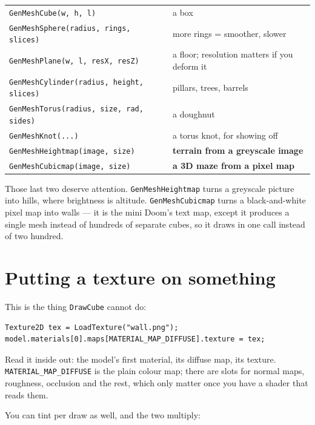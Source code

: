 \begin{center}
\begin{tabular}{@{}ll@{}}
\toprule
\lstinline|GenMeshCube(w, h, l)| & a box \\
\lstinline|GenMeshSphere(radius, rings, slices)| & more rings = smoother, slower \\
\lstinline|GenMeshPlane(w, l, resX, resZ)| & a floor; resolution matters if you deform it \\
\lstinline|GenMeshCylinder(radius, height, slices)| & pillars, trees, barrels \\
\lstinline|GenMeshTorus(radius, size, rad, sides)| & a doughnut \\
\lstinline|GenMeshKnot(...)| & a torus knot, for showing off \\
\lstinline|GenMeshHeightmap(image, size)| & \textbf{terrain from a greyscale image} \\
\lstinline|GenMeshCubicmap(image, size)| & \textbf{a 3D maze from a pixel map} \\
\bottomrule
\end{tabular}
\end{center}

Those last two deserve attention. \lstinline|GenMeshHeightmap| turns a greyscale
picture into hills, where brightness is altitude. \lstinline|GenMeshCubicmap|
turns a black-and-white pixel map into walls --- it is the mini Doom's text map,
except it produces a single mesh instead of hundreds of separate cubes, so it
draws in one call instead of two hundred.

\section{Putting a texture on something}

This is the thing \lstinline|DrawCube| cannot do:

\begin{lstlisting}
Texture2D tex = LoadTexture("wall.png");
model.materials[0].maps[MATERIAL_MAP_DIFFUSE].texture = tex;
\end{lstlisting}

Read it inside out: the model's first material, its diffuse map, its texture.
\lstinline|MATERIAL_MAP_DIFFUSE| is the plain colour map; there are slots for
normal maps, roughness, occlusion and the rest, which only matter once you have a
shader that reads them.

You can tint per draw as well, and the two multiply:

